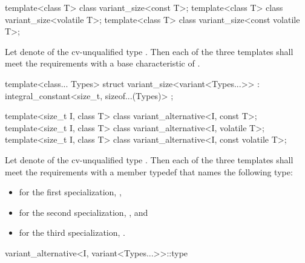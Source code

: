 %
\begin{itemdecl}
template<class T> class variant_size<const T>;
template<class T> class variant_size<volatile T>;
template<class T> class variant_size<const volatile T>;
\end{itemdecl}

\begin{itemdescr}
\pnum
Let  denote  of the cv-unqualified
type . Then each of the three templates shall meet the
 requirements with a
base characteristic of .
\end{itemdescr}

%
\begin{itemdecl}
template<class... Types>
  struct variant_size<variant<Types...>> : integral_constant<size_t, sizeof...(Types)> { };
\end{itemdecl}

%
\begin{itemdecl}
template<size_t I, class T> class variant_alternative<I, const T>;
template<size_t I, class T> class variant_alternative<I, volatile T>;
template<size_t I, class T> class variant_alternative<I, const volatile T>;
\end{itemdecl}

\begin{itemdescr}
\pnum
Let  denote  of the
cv-unqualified type . Then each of the three templates shall
meet the  requirements with a
member typedef  that names the following type:
\begin{itemize}
\item for the first specialization, ,
\item for the second specialization, , and
\item for the third specialization, .
\end{itemize}
\end{itemdescr}

%
\begin{itemdecl}
variant_alternative<I, variant<Types...>>::type
\end{itemdecl}

